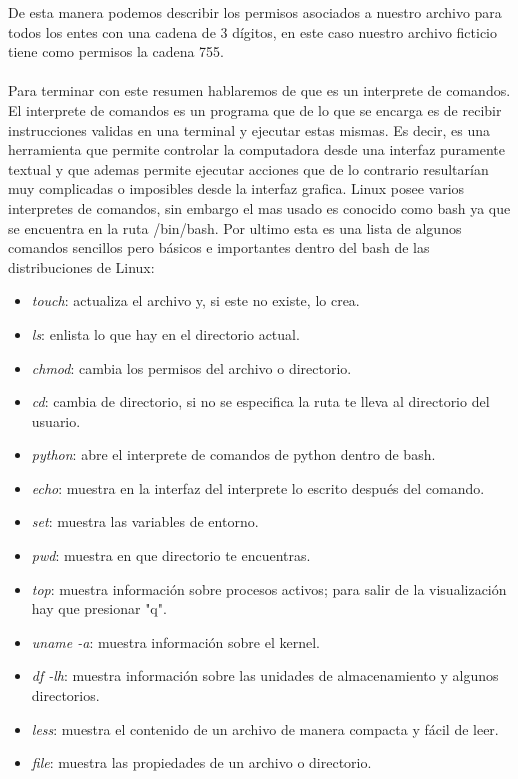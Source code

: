\documentclass[letterpaper, 12pt, oneside]{article}
\begin{document}
	De esta manera podemos describir los permisos asociados a nuestro archivo para todos los entes con una cadena de 3 dígitos, en este caso nuestro archivo ficticio tiene como permisos la cadena 755.
	\\
	\\
	Para terminar con este resumen hablaremos de que es un interprete de comandos. El interprete de comandos es un programa que de lo que se encarga es de recibir instrucciones validas en una terminal y ejecutar estas mismas. Es decir, es una herramienta que permite controlar la computadora desde una interfaz puramente textual y que ademas permite ejecutar acciones que de lo contrario resultarían muy complicadas o imposibles desde la interfaz grafica. Linux posee varios interpretes de comandos, sin embargo el mas usado es conocido como bash ya que se encuentra en la ruta /bin/bash. Por ultimo esta es una lista de algunos comandos sencillos pero básicos e importantes dentro del bash de las distribuciones de Linux:
	\\
	\begin{itemize}
		\item \textit{touch}: actualiza el archivo y, si este no existe, lo crea.
		\item \textit{ls}: enlista lo que hay en el directorio actual.
		\item \textit{chmod}: cambia los permisos del archivo o directorio.
		\item \textit{cd}: cambia de directorio, si no se especifica la ruta te lleva al directorio del usuario.
		\item \textit{python}: abre el interprete de comandos de python dentro de bash.
		\item \textit{echo}: muestra en la interfaz del interprete lo escrito después del comando.
		\item \textit{set}: muestra las variables de entorno.
		\item \textit{pwd}: muestra en que directorio te encuentras.
		\item \textit{top}: muestra información sobre procesos activos; para salir de la visualización hay que presionar "q".
		\item \textit{uname -a}: muestra información sobre el kernel.
		\item \textit{df -lh}: muestra información sobre las unidades de almacenamiento y algunos directorios.
		\item \textit{less}: muestra el contenido de un archivo de manera compacta y fácil de leer.
		\item \textit{file}: muestra las propiedades de un archivo o directorio.
	\\
	\end{itemize}
\end{document}
